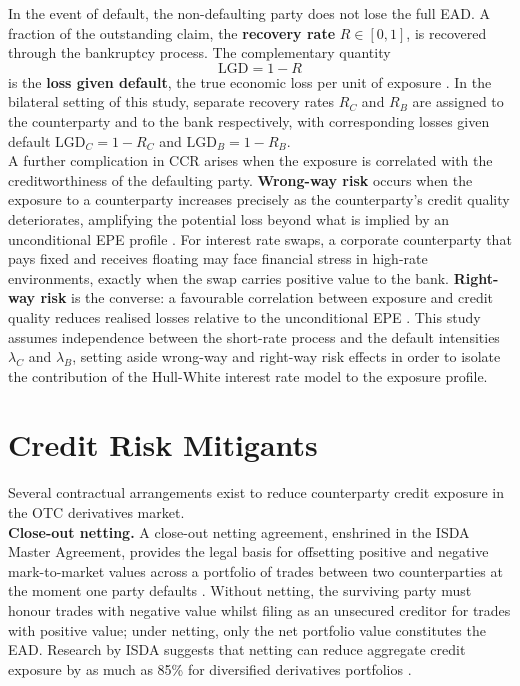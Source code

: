     \noindent
    In the event of default, the non-defaulting party does not lose the full EAD. A fraction of the outstanding claim, the \textbf{recovery rate} $R \in [0,1]$, is recovered through the bankruptcy process. The complementary quantity
    \begin{equation}
        \text{LGD} = 1 - R
        \label{eq:LGD}
    \end{equation}
    is the \textbf{loss given default}, the true economic loss per unit of exposure \cite{Green_2016}. In the bilateral setting of this study, separate recovery rates $R_C$ and $R_B$ are assigned to the counterparty and to the bank respectively, with corresponding losses given default $\text{LGD}_C = 1 - R_C$ and $\text{LGD}_B = 1 - R_B$. \\

    \noindent
    A further complication in CCR arises when the exposure is correlated with the creditworthiness of the defaulting party. \textbf{Wrong-way risk} occurs when the exposure to a counterparty increases precisely as the counterparty's credit quality deteriorates, amplifying the potential loss beyond what is implied by an unconditional EPE profile \cite{Green_2016}. For interest rate swaps, a corporate counterparty that pays fixed and receives floating may face financial stress in high-rate environments, exactly when the swap carries positive value to the bank. \textbf{Right-way risk} is the converse: a favourable correlation between exposure and credit quality reduces realised losses relative to the unconditional EPE \cite{Gregory_2015}. This study assumes independence between the short-rate process and the default intensities $\lambda_C$ and $\lambda_B$, setting aside wrong-way and right-way risk effects in order to isolate the contribution of the Hull-White interest rate model to the exposure profile.

    \section*{Credit Risk Mitigants}
    \label{sec:credit-mitigants}

    \noindent
    Several contractual arrangements exist to reduce counterparty credit exposure in the OTC derivatives market. \\

    \noindent
    \textbf{Close-out netting.} A close-out netting agreement, enshrined in the ISDA Master Agreement, provides the legal basis for offsetting positive and negative mark-to-market values across a portfolio of trades between two counterparties at the moment one party defaults \cite{Green_2016}. Without netting, the surviving party must honour trades with negative value whilst filing as an unsecured creditor for trades with positive value; under netting, only the net portfolio value constitutes the EAD. Research by ISDA suggests that netting can reduce aggregate credit exposure by as much as 85\% for diversified derivatives portfolios \cite{brigo2013counterparty}. \\

